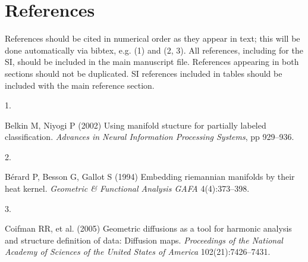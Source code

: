 \documentclass[9pt,twocolumn,twoside,]{pnas-new}
\newlength{\cslhangindent}
\newlength{\csllabelwidth}
\newenvironment{CSLReferences}[2] %
 {\begin{list}{}{%
  \setlength{\itemindent}{0pt}
  \setlength{\leftmargin}{0pt}
  \setlength{\parsep}{0pt}
  \ifodd #1
   \setlength{\leftmargin}{\cslhangindent}
   \setlength{\itemindent}{-1\cslhangindent}
  \fi
  \setlength{\itemsep}{#2\baselineskip}}}
 {\end{list}}
\newcommand{\CSLLeftMargin}[1]{\parbox[t]{\csllabelwidth}{#1}}
\newcommand{\CSLRightInline}[1]{\parbox[t]{\linewidth - \csllabelwidth}{#1}\break}
\begin{document}
\section*{References}\label{references}

References should be cited in numerical order as they appear in text;
this will be done automatically via bibtex, e.g. (1) and (2, 3). All
references, including for the SI, should be included in the main
manuscript file. References appearing in both sections should not be
duplicated. SI references included in tables should be included with the
main reference section.

\showmatmethods
\showacknow
\pnasbreak

\label{refs}
\begin{CSLReferences}{0}{1}
\CSLLeftMargin{1. }%
\CSLRightInline{Belkin M, Niyogi P (2002) Using manifold stucture for
partially labeled classification. \emph{Advances in Neural Information
Processing Systems}, pp 929--936.}

\CSLLeftMargin{2. }%
\CSLRightInline{Bérard P, Besson G, Gallot S (1994) Embedding riemannian
manifolds by their heat kernel. \emph{Geometric \& Functional Analysis
GAFA} 4(4):373--398.}

\CSLLeftMargin{3. }%
\CSLRightInline{Coifman RR, et al. (2005) Geometric diffusions as a tool
for harmonic analysis and structure definition of data: Diffusion maps.
\emph{Proceedings of the National Academy of Sciences of the United
States of America} 102(21):7426--7431.}

\end{CSLReferences}



% 
\end{document}
